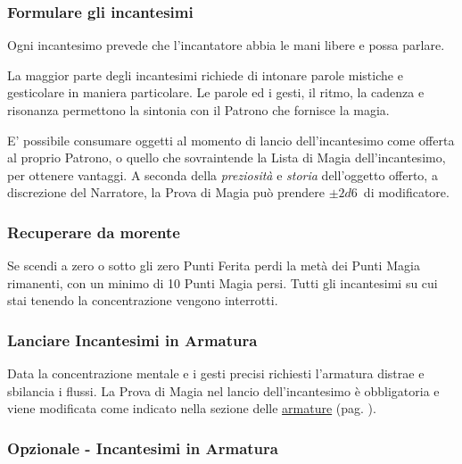 \begin{multicols}{2}
\subsubsection{Formulare gli incantesimi}\label{magiecomponenti}

Ogni incantesimo prevede che l'incantatore abbia le mani libere e possa parlare.

La maggior parte degli incantesimi richiede di intonare parole mistiche e gesticolare in maniera particolare. Le parole ed i gesti, il ritmo, la cadenza e risonanza permettono la sintonia con il Patrono che fornisce la magia.

E' possibile consumare oggetti al momento di lancio dell'incantesimo come offerta al proprio Patrono, o quello che sovraintende la Lista di Magia dell'incantesimo, per ottenere vantaggi. A seconda della \emph{preziosità} e \emph{storia} dell'oggetto offerto, a discrezione del Narratore, la Prova di Magia può prendere $\pm2d6$\ di modificatore.

\subsubsection{Recuperare da morente}\label{magieessereucciso}

Se scendi a zero o sotto gli zero Punti Ferita perdi la metà dei Punti Magia rimanenti, con un minimo di 10 Punti Magia persi. Tutti gli incantesimi su cui stai tenendo la concentrazione vengono interrotti.

\subsubsection{Lanciare Incantesimi in Armatura}\label{magielanciareincantesimiinarmatura}

Data la concentrazione mentale e i gesti precisi richiesti l'armatura distrae e sbilancia i flussi. La Prova di Magia nel lancio dell'incantesimo è obbligatoria e viene modificata come indicato nella sezione delle \hyperlink{armatureemagie}{armature} (pag. \pageref{armatureemagie}).

\subsubsection{Opzionale - Incantesimi in Armatura}


\end{multicols}
